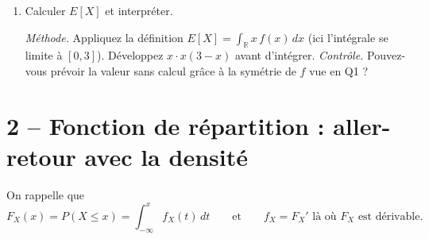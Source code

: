 \begin{enumerate}
  \item Calculer $E[X]$ et interpréter.
  \begin{solution}
    \textit{Méthode.} Appliquez la définition
    $E[X]=\int_{\mathbb R} x\,f(x)\,dx$ (ici l'intégrale se limite à
    $[0,3]$). Développez $x\cdot x(3-x)$ avant d'intégrer.
    \textit{Contrôle.} Pouvez-vous prévoir la valeur
    sans calcul grâce à la symétrie de $f$ vue en Q1 ?
  \end{solution}
\end{enumerate}

\section*{2 -- Fonction de répartition : aller-retour avec la densité}

On rappelle que
\[
  F_X(x)=P(X\le x)=\int_{-\infty}^x f_X(t)\,dt
  \qquad\text{et}\qquad
  f_X=F_X'\text{ là où }F_X\text{ est dérivable.}
\]

